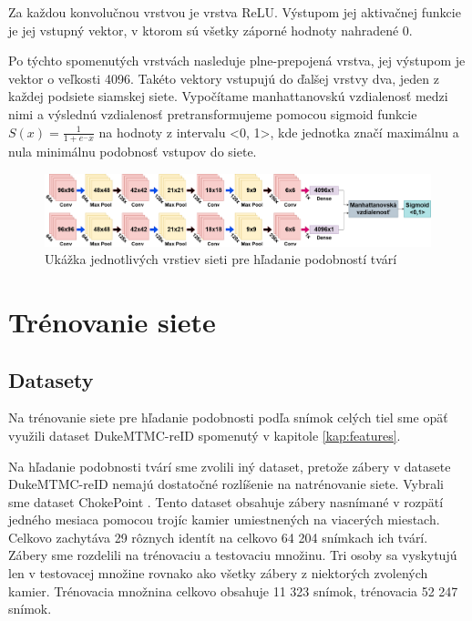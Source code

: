 Za každou konvolučnou vrstvou je vrstva ReLU. 
Výstupom jej aktivačnej funkcie je jej vstupný vektor, v ktorom sú všetky záporné hodnoty nahradené 0.

Po týchto spomenutých vrstvách nasleduje plne-prepojená vrstva, jej výstupom je vektor o veľkosti 4096.
Takéto vektory vstupujú do ďalšej vrstvy dva, jeden z každej podsiete siamskej siete.
Vypočítame manhattanovskú vzdialenosť medzi nimi a výslednú vzdialenosť pretransformujeme pomocou sigmoid funkcie $S(x) = \frac{1}{1 + e^-x}$ na hodnoty z intervalu <0, 1>, 
kde jednotka značí maximálnu a nula minimálnu podobnosť vstupov do siete.

\begin{figure}[H]
\centerline{\includegraphics[width=1\textwidth]{images/siamese_architecture}}
\caption[Architektúra siete pre hľadanie podobností tvárí]{Ukážka jednotlivých vrstiev sieti pre hľadanie podobností tvárí}
\label{obr:siamese_architecture}
\end{figure}

\section{Trénovanie siete} \label{kap:siamese_train}
\subsection{Datasety}
Na trénovanie siete pre hľadanie podobnosti podľa snímok celých tiel sme opäť využili dataset DukeMTMC-reID \cite{ristani2016MTMC} \cite{zheng2017unlabeled} spomenutý v kapitole \ref{kap:features}.

Na hľadanie podobnosti tvárí sme zvolili iný dataset, pretože zábery v datasete DukeMTMC-reID nemajú dostatočné rozlíšenie na natrénovanie siete.
Vybrali sme dataset ChokePoint \cite{wong_cvprw_2011}. 
Tento dataset obsahuje zábery nasnímané v rozpätí jedného mesiaca pomocou trojíc kamier umiestnených na viacerých miestach.
Celkovo zachytáva 29 rôznych identít na celkovo 64 204 snímkach ich tvárí.
Zábery sme rozdelili na trénovaciu a testovaciu množinu.
Tri osoby sa vyskytujú len v testovacej množine rovnako ako všetky zábery z niektorých zvolených kamier.
Trénovacia množnina celkovo obsahuje 11 323 snímok, trénovacia 52 247 snímok.

